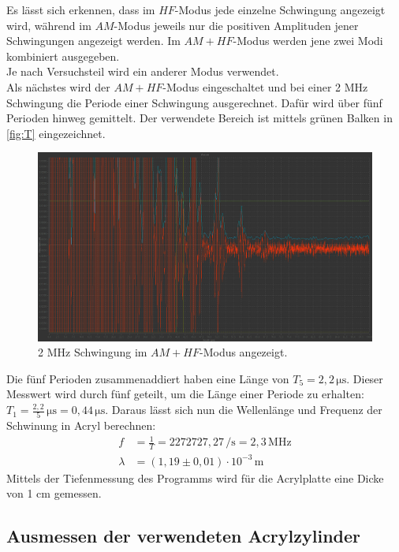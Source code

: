   Es lässt sich erkennen, dass im $HF$-Modus jede einzelne Schwingung angezeigt wird, während
  im $AM$-Modus jeweils nur die positiven Amplituden jener Schwingungen angezeigt werden. Im $AM + HF$-Modus
  werden jene zwei Modi kombiniert ausgegeben.\\
  Je nach Versuchsteil wird ein anderer Modus verwendet.\\
  Als nächstes wird der $AM + HF$-Modus eingeschaltet und bei einer 2 MHz Schwingung die Periode einer Schwingung
  ausgerechnet. Dafür wird über fünf Perioden hinweg gemittelt. Der verwendete Bereich ist mittels grünen Balken 
  in \autoref{fig:T} eingezeichnet.
  \begin{figure}
    \centering
    \includegraphics[width=15cm]{messwerte/Vorbereitung/T.png}
    \caption{2 MHz Schwingung im $AM + HF$-Modus angezeigt.}
    \label{fig:T}
  \end{figure}
  Die fünf Perioden zusammenaddiert haben eine Länge von $T_5 =2,2 \, \si{\micro\second}$. Dieser Messwert wird
  durch fünf geteilt, um die Länge einer Periode zu erhalten: $T_1 = \frac{2,2}{5} \, \si{\micro\second} = 0,44 \, \si{\micro\second}$.
  Daraus lässt sich nun die Wellenlänge und Frequenz der Schwinung in Acryl berechnen:
  \begin{align*}
    f &= \frac{1}{T} = 2 272 727,27 \, \si{\per\second} = 2,3 \, \mathrm{MHz}\\
    \lambda &= (1,19 \pm 0,01) \cdot 10^{-3} \, \si{\meter}
  \end{align*}
  Mittels der Tiefenmessung des Programms wird für die Acrylplatte eine Dicke von 1 cm gemessen.

\subsection{Ausmessen der verwendeten Acrylzylinder}

